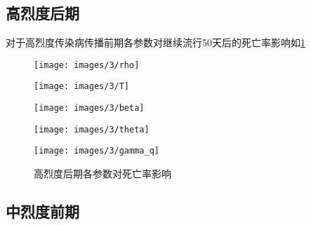 \documentclass[withoutpreface,bwprint]{cumcmthesis}
\begin{document}
\subsection{高烈度后期}
对于高烈度传染病传播前期各参数对继续流行50天后的死亡率影响如\cref{fig:8}
\begin{figure}[H]
    \centering
    \begin{minipage}[c]{0.3\textwidth}
        \centering
        \texttt{[image: images/3/rho]}
        \subcaption{$\rho$}
    \end{minipage}
    \begin{minipage}[c]{0.3\textwidth}
        \centering
        \texttt{[image: images/3/T]}
    \end{minipage}
    \begin{minipage}[c]{0.3\textwidth}
        \centering
        \texttt{[image: images/3/beta]}
        \subcaption{$\beta$}
    \end{minipage}

    \begin{minipage}[c]{0.3\textwidth}
        \centering
        \texttt{[image: images/3/theta]}
        \subcaption{$\theta$}
    \end{minipage}
    \begin{minipage}[c]{0.3\textwidth}
        \centering
        \texttt{[image: images/3/gamma\_q]}
    \end{minipage}
    \caption{高烈度后期各参数对死亡率影响}
    \label{fig:8}
    
\end{figure}

\subsection{中烈度前期}
\end{document}
